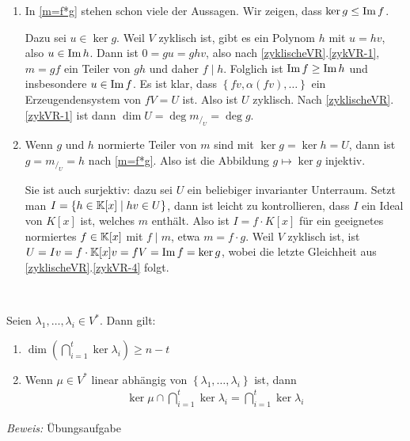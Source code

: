 \begin{mysatz}
\begin{enumerate}
        \item In \ref{m=f*g} stehen schon viele der Aussagen. Wir zeigen, dass $\ker g \leq \text{Im}\, f$.

            Dazu sei $u \in \ker g$. Weil $V$ zyklisch ist, gibt es ein Polynom $h$ mit $u = hv$, also $u \in \text{Im}\, h$.
            Dann ist $0 = gu = ghv$, also nach \ref{zyklischeVR}.\ref{zykVR-1}, $m = gf$ ein Teiler von $gh$ und daher $f \mid h$.
            Folglich ist $\text{Im}\, f \geq \text{Im}\, h$ und insbesondere $u \in \text{Im}\, f$. Es ist klar, dass $\left\{ fv, \alpha(fv), \ldots \right\}$ ein Erzeugendensystem von $ fV=U$ ist.
            Also ist $U$ zyklisch. Nach \ref{zyklischeVR}.\ref{zykVR-1} ist dann $\dim U = \deg m_{/_U} = \deg g$.

        \item Wenn $g$ und $h$ normierte Teiler von $m$ sind mit $\ker g = \ker h = U$, dann ist $g = m_{/_U} = h$ nach \ref{m=f*g}.
            Also ist die Abbildung $g \mapsto \ker g$ injektiv.

            Sie ist auch surjektiv: dazu sei $U$ ein beliebiger invarianter Unterraum.
            Setzt man $I = \left\{ h \in \mathbb{K}[x] \mid hv \in U \right\}$, dann ist leicht zu kontrollieren, dass $I$ ein Ideal von $K[x]$ ist, welches $m$ enthält.
            Also ist $I = f \cdot K[x]$ für ein geeignetes normiertes $f \in \mathbb{K}[x]$ mit $f \mid m$, etwa $m = f \cdot g$.
            Weil $V$ zyklisch ist, ist $U = Iv = f \cdot \mathbb{K}[x] v = fV = \text{Im}\, f = \ker g$, wobei die letzte Gleichheit aus \ref{zyklischeVR}.\ref{zykVR-4} folgt.
    \end{enumerate}
\end{mysatz}


\begin{mylemma}\label{lem3.5}\

    Seien $\lambda_1, \ldots, \lambda_i \in V^{*}$. Dann gilt:
    \begin{enumerate}
        \item $\dim \left( \bigcap\limits_{i=1}^t \ker \lambda_i \right) \geq n-t$
        \item Wenn $\mu \in V^{*}$ linear abhängig von $\left\{ \lambda_1, \ldots, \lambda_i \right\}$ ist, dann
            \begin{align*}
                \ker \mu \cap \bigcap\limits_{i=1}^t \ker \lambda_i = \bigcap\limits_{i=1}^t \ker \lambda_i
            \end{align*}
    \end{enumerate}
    \textit{Beweis:} Übungsaufgabe 
\end{mylemma}

